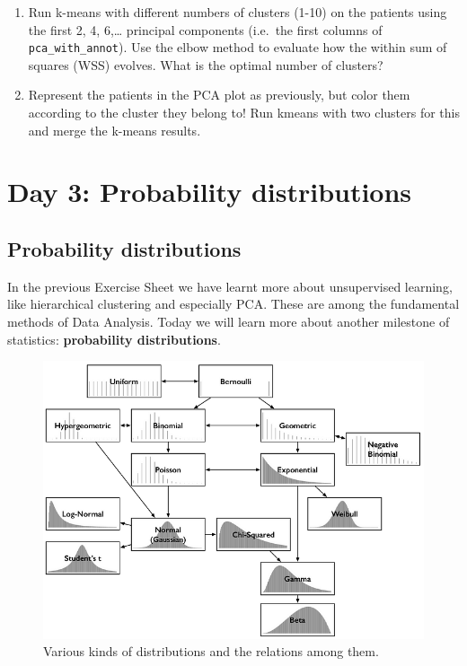 \documentclass[
]{book}
\begin{document}
\begin{enumerate}
\def\labelenumi{\arabic{enumi}.}
\item
  Run k-means with different numbers of clusters (1-10) on the patients using the first 2, 4, 6,\ldots{} principal components (i.e.~the first columns of \texttt{pca\_with\_annot}). Use the elbow method to evaluate how the within sum of squares (WSS) evolves. What is the optimal number of clusters?
\item
  Represent the patients in the PCA plot as previously, but color them according to the cluster they belong to! Run kmeans with two clusters for this and merge the k-means results.
\end{enumerate}

\hypertarget{day-3-probability-distributions}{%
\section{Day 3: Probability distributions}\label{day-3-probability-distributions}}

\hypertarget{probability-distributions}{%
\subsection{Probability distributions}\label{probability-distributions}}

In the previous Exercise Sheet we have learnt more about unsupervised learning, like hierarchical clustering and especially PCA. These are among the fundamental methods of Data Analysis. Today we will learn more about another milestone of statistics: \textbf{probability distributions}.

\begin{figure}
\centering
\includegraphics{figures/distrib.png}
\caption{Various kinds of distributions and the relations among them.}
\end{figure}
\end{document}
